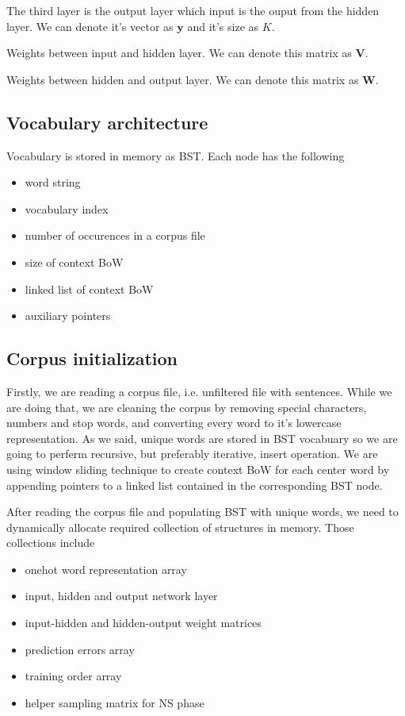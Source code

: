 \documentclass{article}
\begin{document}
\medbreak

The third layer is the output layer which input is the ouput from the hidden
layer.
We can denote it's vector as $\boldsymbol{y}$ and it's size as $K$.

\medbreak

Weights between input and hidden layer. We can denote this matrix as $\boldsymbol{V}$.

\medbreak

Weights between hidden and output layer. We can denote this matrix as $\boldsymbol{W}$.

\subsection{Vocabulary architecture}

Vocabulary is stored in memory as BST. Each node has the following

\begin{itemize}
	\item word string
	\item vocabulary index
	\item number of occurences in a corpus file
	\item size of context BoW
	\item linked list of context BoW
	\item auxiliary pointers
\end{itemize}

\subsection{Corpus initialization}

Firstly, we are reading a corpus file, i.e. unfiltered file with sentences.
While we are doing that, we are cleaning the corpus by removing special
characters, numbers and stop words, and converting every word to it's
lowercase representation. As we said, unique words are stored in BST
vocabuary so we are going to perferm recursive, but preferably iterative,
insert operation. We are using window sliding technique to create context BoW 
for each center word by appending pointers to a linked list contained in the
corresponding BST node.

\medbreak

After reading the corpus file and populating BST with unique words, we need to
dynamically allocate required collection of structures in memory. Those
collections include

\begin{itemize}
	\item onehot word representation array
	\item input, hidden and output network layer
	\item input-hidden and hidden-output weight matrices
	\item prediction errors array
	\item training order array
	\item helper sampling matrix for NS phase
\end{itemize}
\end{document}
